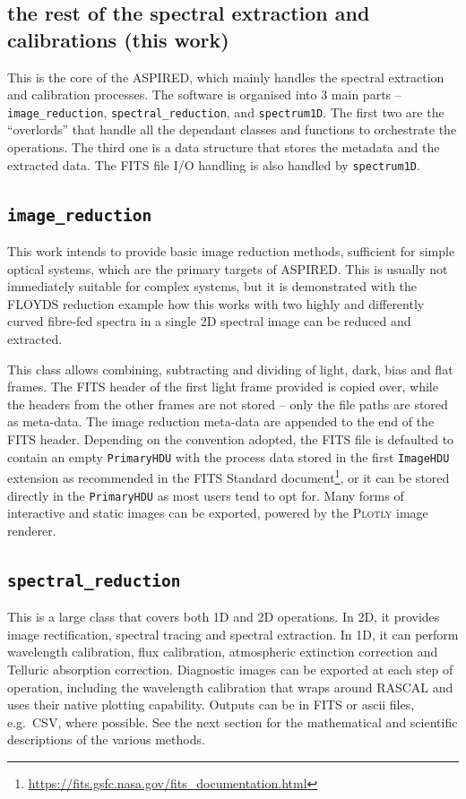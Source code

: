 \documentclass[fleqn,usenatbib]{mnras}
\begin{document}
\subsection*{the rest of the spectral extraction and calibrations (this work)}
This is the core of the \textsc{ASPIRED}, which mainly handles the spectral
extraction and calibration processes. The software is organised into
3 main parts -- \texttt{image\_reduction}, \texttt{spectral\_reduction},
and \texttt{spectrum1D}. The first two are the ``overlords'' that handle
all the dependant classes and functions to orchestrate the operations.
The third one is a data structure that stores the metadata and the extracted
data. The FITS file I/O handling is also handled by \texttt{spectrum1D}.

\subsection{\texttt{image\_reduction}}
This work intends to provide basic image reduction methods, sufficient
for simple optical systems, which are the primary targets of \textsc{ASPIRED}.
This is usually not immediately suitable for complex systems, but it
is demonstrated with the FLOYDS reduction example how this works with
two highly and differently curved fibre-fed spectra in a single 2D spectral
image can be reduced and extracted.

This class allows combining, subtracting and dividing of light, dark, bias
and flat frames. The FITS header of the first light frame provided is
copied over, while the headers from the other frames are not stored -- only
the file paths are stored as meta-data. The image reduction meta-data
are appended to the end of the FITS header. Depending on the convention
adopted, the FITS file is defaulted to contain an empty \texttt{PrimaryHDU}
with the process data stored in the first \texttt{ImageHDU} extension as
recommended in the FITS Standard 
document\footnote{\url{https://fits.gsfc.nasa.gov/fits_documentation.html}},
or it can be stored directly in the \texttt{PrimaryHDU} as most users tend
to opt for. Many forms of interactive and static images can be exported,
powered by the \textsc{Plotly} image renderer.

\subsection{\texttt{spectral\_reduction}}
This is a large class that covers both 1D and 2D operations. In 2D, it
provides image rectification, spectral tracing and spectral extraction.
In 1D, it can perform wavelength calibration, flux calibration, atmospheric
extinction correction and Telluric absorption correction. Diagnostic images
can be exported at each step of operation, including the wavelength calibration
that wraps around \textsc{RASCAL} and uses their native plotting capability.
Outputs can be in FITS or ascii files, e.g.\ CSV, where possible. See the next
section for the mathematical and scientific descriptions of the various methods.
\end{document}
